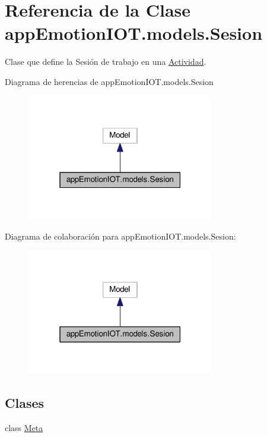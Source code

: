 \hypertarget{classappEmotionIOT_1_1models_1_1Sesion}{}\section{Referencia de la Clase app\+Emotion\+I\+O\+T.\+models.\+Sesion}
\label{classappEmotionIOT_1_1models_1_1Sesion}


Clase que define la Sesión de trabajo en una \hyperlink{classappEmotionIOT_1_1models_1_1Actividad}{Actividad}.  




Diagrama de herencias de app\+Emotion\+I\+O\+T.\+models.\+Sesion
\nopagebreak
\begin{figure}[H]
\begin{center}
\leavevmode
\includegraphics[width=232pt]{classappEmotionIOT_1_1models_1_1Sesion__inherit__graph}
\end{center}
\end{figure}


Diagrama de colaboración para app\+Emotion\+I\+O\+T.\+models.\+Sesion\+:
\nopagebreak
\begin{figure}[H]
\begin{center}
\leavevmode
\includegraphics[width=232pt]{classappEmotionIOT_1_1models_1_1Sesion__coll__graph}
\end{center}
\end{figure}
\subsection*{Clases}
\begin{DoxyCompactItemize}
\item 
class \hyperlink{classappEmotionIOT_1_1models_1_1Sesion_1_1Meta}{Meta}
\end{DoxyCompactItemize}
